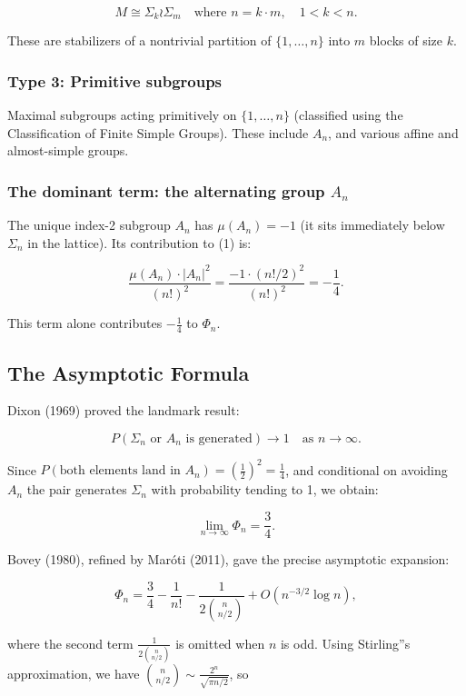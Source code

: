 \documentclass[12pt,a4paper]{article}
\begin{document}
\[M \cong Σ_k \wr Σ_m \quad \text{where } n = k \cdot m, \quad 1 < k < n.\]


These are stabilizers of a nontrivial partition of $\{1,\dots,n\}$ into $m$ blocks of size $k$.

\subsubsection{Type 3: Primitive subgroups}

Maximal subgroups acting primitively on $\{1,\dots,n\}$ (classified using the
Classification of Finite Simple Groups). These include $A_n$, and various affine
and almost-simple groups.

\subsubsection{The dominant term: the alternating group $A_n$}

The unique index-2 subgroup $A_n$ has $\mu(A_n) = -1$ (it sits immediately below
$Σ_n$ in the lattice). Its contribution to (1) is:

\[\frac{\mu(A_n) \cdot |A_n|^2}{(n!)^2} = \frac{-1 \cdot (n!/2)^2}{(n!)^2} = -\frac{1}{4}.\]

This term alone contributes $-\tfrac{1}{4}$ to $Φ_n$.

\subsection{The Asymptotic Formula}

Dixon (1969) proved the landmark result:

\[P(Σ_n \text{ or } A_n \text{ is generated}) \to 1 \quad \text{as } n \to \infty.\]

Since $P(\text{both elements land in } A_n) = \left(\frac{1}{2}\right)^2 = \frac{1}{4}$,
and conditional on avoiding $A_n$ the pair generates $Σ_n$ with probability tending
to 1, we obtain:

\[\boxed{\lim_{n \to \infty} Φ_n = \frac{3}{4}.}\]

Bovey (1980), refined by Maróti (2011), gave the precise asymptotic expansion:

\[Φ_n = \frac{3}{4} - \frac{1}{n!} - \frac{1}{2\binom{n}{n/2}} + O\left(n^{-3/2}\log n\right),\]

where the second term $\frac{1}{2\binom{n}{n/2}}$ is omitted when $n$ is odd.
Using Stirling''s approximation, we have $\binom{n}{n/2} \sim \frac{2^n}{\sqrt{\pi n/2}}$, so
\end{document}
